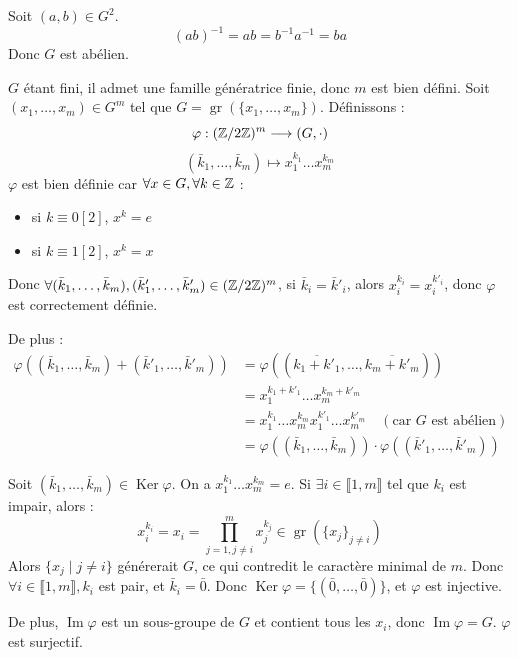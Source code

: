 \begin{solution}
Soit $(a,b) \in G^2$.
\[ (ab)^{-1} = ab = b^{-1}a^{-1} = ba \]
Donc $G$ est abélien.

$G$ étant fini, il admet une famille génératrice finie, donc $m$ est bien défini.
Soit $(x_1, \dots, x_m) \in G^m$ tel que $G = \operatorname{gr}(\{x_1, \dots, x_m\})$.
Définissons :
\[ \varphi : (\mathbb Z/2\mathbb Z)^m \longrightarrow (G, \cdot) \]
\[ (\bar{k}_1, \dots, \bar{k}_m) \longmapsto x_1^{k_1} \dots x_m^{k_m} \]
$\varphi$ est bien définie car $\forall x \in G, \forall k \in \mathbb Z$ :
\begin{itemize}
  \item si $k \equiv 0 [2]$, $x^k = e$
  \item si $k \equiv 1 [2]$, $x^k = x$
\end{itemize}
Donc $\forall (\bar{k}_1, \dots, \bar{k}_m), (\bar{k}'_1, \dots, \bar{k}'_m) \in (\mathbb Z/2\mathbb Z)^m$, si $\bar{k}_i = \bar{k}'_i$, alors $x_i^{k_i} = x_i^{k'_i}$, donc $\varphi$ est correctement définie.

De plus :
\begin{align*}
\varphi((\bar{k}_1, \dots, \bar{k}_m) + (\bar{k}'_1, \dots, \bar{k}'_m)) &= \varphi((\overline{k_1+k'_1}, \dots, \overline{k_m+k'_m})) \\
&= x_1^{k_1+k'_1} \dots x_m^{k_m+k'_m} \\
&= x_1^{k_1} \dots x_m^{k_m} x_1^{k'_1} \dots x_m^{k'_m} \quad (\text{car } G \text{ est abélien}) \\
&= \varphi((\bar{k}_1, \dots, \bar{k}_m)) \cdot \varphi((\bar{k}'_1, \dots, \bar{k}'_m))
\end{align*}

Soit $(\bar{k}_1, \dots, \bar{k}_m) \in \operatorname{Ker} \varphi$. On a $x_1^{k_1} \dots x_m^{k_m} = e$.
Si $\exists i \in \llbracket 1, m \rrbracket$ tel que $k_i$ est impair, alors :
\[ x_i^{k_i} = x_i = \prod_{j=1, j \neq i}^m x_j^{k_j} \in \operatorname{gr}\left(\{x_j\}_{j \neq i}\right) \]
Alors $\{x_j \mid j \neq i\}$ générerait $G$, ce qui contredit le caractère minimal de $m$.
Donc $\forall i \in \llbracket 1, m \rrbracket, k_i$ est pair, et $\bar{k}_i = \bar{0}$.
Donc $\operatorname{Ker} \varphi = \{(\bar{0}, \dots, \bar{0})\}$, et $\varphi$ est injective.

De plus, $\operatorname{Im} \varphi$ est un sous-groupe de $G$ et contient tous les $x_i$, donc $\operatorname{Im} \varphi = G$. $\varphi$ est surjectif.


\end{solution}

